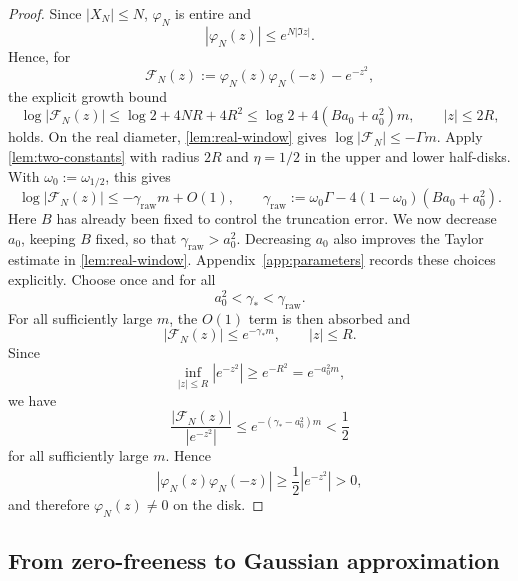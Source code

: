 \begin{proof}
Since $|X_N|\le N$, $\varphi_N$ is entire and
\[
|\varphi_N(z)|\le e^{N|\Im z|}.
\]
Hence, for
\[
\mathcal F_N(z):=\varphi_N(z)\varphi_N(-z)-e^{-z^2},
\]
the explicit growth bound
\[
\log|\mathcal F_N(z)|\le\log2+4NR+4R^2
\le\log2+4(Ba_0+a_0^2)m,
\qquad |z|\le2R,
\]
holds. On the real diameter, \cref{lem:real-window} gives $\log|\mathcal F_N|\le-\Gamma m$. Apply \cref{lem:two-constants} with radius $2R$ and $\eta=1/2$ in the upper and lower half-disks. With $\omega_0:=\omega_{1/2}$, this gives
\[
\log|\mathcal F_N(z)|
\le-\gamma_{\mathrm{raw}}m+O(1),
\qquad
\gamma_{\mathrm{raw}}:=\omega_0\Gamma-4(1-\omega_0)(Ba_0+a_0^2).
\]
Here $B$ has already been fixed to control the truncation error. We now decrease $a_0$, keeping $B$ fixed, so that $\gamma_{\mathrm{raw}}>a_0^2$. Decreasing $a_0$ also improves the Taylor estimate in \cref{lem:real-window}. Appendix~\ref{app:parameters} records these choices explicitly. Choose once and for all
\[
a_0^2<\gamma_*<\gamma_{\mathrm{raw}}.
\]
For all sufficiently large $m$, the $O(1)$ term is then absorbed and
\[
|\mathcal F_N(z)|\le e^{-\gamma_*m},
\qquad |z|\le R.
\]
Since
\[
\inf_{|z|\le R}|e^{-z^2}|\ge e^{-R^2}=e^{-a_0^2m},
\]
we have
\[
\frac{|\mathcal F_N(z)|}{|e^{-z^2}|}
\le e^{-(\gamma_*-a_0^2)m}<\frac12
\]
for all sufficiently large $m$. Hence
\[
|\varphi_N(z)\varphi_N(-z)|
\ge\frac12|e^{-z^2}|>0,
\]
and therefore $\varphi_N(z)\ne0$ on the disk.
\end{proof}

\subsection{From zero-freeness to Gaussian approximation}


